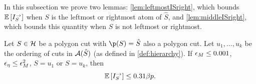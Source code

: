 %
In this subsection we prove two lemmas: \cref{lem:leftmostISright}, which bounds ${\mathbb{E}}\left[I_S^\rightarrow\right]$ when $S$ is the leftmost or rightmost atom of $\hat S$, and \cref{lem:middleISright}, which bounds this quantity when $S$ is not leftmost or rightmost.
\begin{lemma}\label{lem:leftmostISright}
Let $S\in\mathcal{H}$ be a polygon cut with $\p(S)=\hat{S}$ also a polygon cut. Let $u_1,\dots,u_k$ be the ordering of cuts in ${\cal A}(\hat{S})$ (as defined in \cref{def:hierarchy}). If ${\epsilon}_M\leq 0.001$, ${\epsilon}_\eta\leq {\epsilon}_M^2$, $S=u_1$ or $S=u_k$, then 
$$ {\mathbb{E}}\left[I_S^\rightarrow\right] \leq 0.31 \beta p.  $$
\end{lemma}
